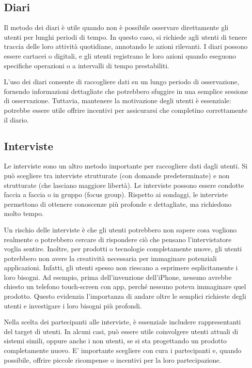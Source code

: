 \subsection{Diari}
Il metodo dei diari è utile quando non è possibile osservare direttamente gli utenti per lunghi periodi di tempo. In questo caso, si richiede agli utenti di tenere traccia delle loro attività quotidiane, annotando le azioni rilevanti. I diari possono essere cartacei o digitali, e gli utenti registrano le loro azioni quando eseguono specifiche operazioni o a intervalli di tempo prestabiliti.

L'uso dei diari consente di raccogliere dati su un lungo periodo di osservazione, fornendo informazioni dettagliate che potrebbero sfuggire in una semplice sessione di osservazione. Tuttavia, mantenere la motivazione degli utenti è essenziale: potrebbe essere utile offrire incentivi per assicurarsi che completino correttamente il diario.

\subsection{Interviste}
Le interviste sono un altro metodo importante per raccogliere dati dagli utenti. Si può scegliere tra interviste strutturate (con domande predeterminate) e non strutturate (che lasciano maggiore libertà). Le interviste possono essere condotte faccia a faccia o in gruppo (focus group). Rispetto ai sondaggi, le interviste permettono di ottenere conoscenze più profonde e dettagliate, ma richiedono molto tempo.

Un rischio delle interviste è che gli utenti potrebbero non sapere cosa vogliono realmente o potrebbero cercare di rispondere ciò che pensano l'intervistatore voglia sentire. Inoltre, per prodotti o tecnologie completamente nuove, gli utenti potrebbero non avere la creatività necessaria per immaginare potenziali applicazioni. Infatti, gli utenti spesso non riescano a esprimere esplicitamente i loro bisogni. Ad esempio, prima dell’invenzione dell'iPhone, nessuno avrebbe chiesto un telefono touch-screen con app, perché nessuno poteva immaginare quel prodotto. Questo evidenzia l'importanza di andare oltre le semplici richieste degli utenti e investigare i loro bisogni più profondi.

Nella scelta dei partecipanti alle interviste, è essenziale includere rappresentanti del target di utenti. In alcuni casi, può essere utile coinvolgere utenti attuali di sistemi simili, oppure anche i non utenti, se si sta progettando un prodotto completamente nuovo. E' importante scegliere con cura i partecipanti e, quando possibile, offrire piccole ricompense o incentivi per la loro partecipazione.

